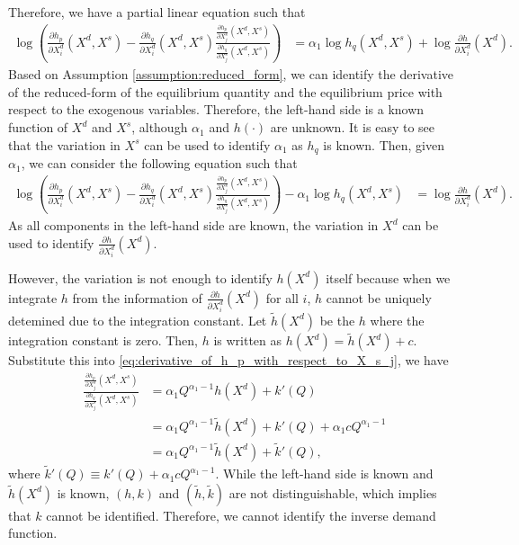\documentclass[11pt, a4paper]{article}
\theoremstyle{remark}
\begin{document}
Therefore, we have a partial linear equation such that
\begin{align}
    \log \left(\frac{\partial h_p}{\partial X^{d}_i}(X^{d}, X^{s})  - \frac{\partial h_q}{\partial X^{d}_i}(X^{d}, X^{s})\frac{\frac{\partial h_p}{\partial X^{s}_j}(X^{d}, X^{s})}{\frac{\partial h_q}{\partial X^{s}_j}(X^{d}, X^{s})}\right) & = \alpha_1 \log h_q(X^{d}, X^{s}) + \log \frac{\partial h}{\partial X^{d}_i}(X^{d}).
\end{align}
Based on Assumption \ref{assumption:reduced_form}, we can identify the derivative of the reduced-form of the equilibrium quantity and the equilibrium price with respect to the exogenous variables.
Therefore, the left-hand side is a known function of $X^{d}$ and $X^{s}$, although $\alpha_1$ and $h(\cdot)$ are unknown.
It is easy to see that the variation in $X^{s}$ can be used to identify $\alpha_1$ as $h_q$ is known.
Then, given $\alpha_1$, we can consider the following equation such that
\begin{align}
    \log \left(\frac{\partial h_p}{\partial X^{d}_i}(X^{d}, X^{s})  - \frac{\partial h_q}{\partial X^{d}_i}(X^{d}, X^{s})\frac{\frac{\partial h_p}{\partial X^{s}_j}(X^{d}, X^{s})}{\frac{\partial h_q}{\partial X^{s}_j}(X^{d}, X^{s})}\right) - \alpha_1 \log h_q(X^{d}, X^{s}) & = \log \frac{\partial h}{\partial X^{d}_i}(X^{d}).
\end{align}
As all components in the left-hand side are known, the variation in $X^{d}$ can be used to identify $\frac{\partial h}{\partial X^{d}_i}(X^{d})$.

However, the variation is not enough to identify $h(X^{d})$ itself because when we integrate $h$ from the information of $\frac{\partial h}{\partial X^{d}_i}(X^{d})$ for all $i$, $h$ cannot be uniquely detemined due to the integration constant.
Let $\tilde{h}(X^{d})$ be the $h$ where the integration constant is zero.
Then, $h$ is written as $h(X^{d}) = \tilde{h}(X^{d}) + c$.
Substitute this into \eqref{eq:derivative_of_h_p_with_respect_to_X_s_j}, we have
\begin{align}
    \frac{\frac{\partial h_p}{\partial X^{s}_j}(X^{d}, X^{s})}{\frac{\partial h_q}{\partial X^{s}_j}(X^{d}, X^{s})} &= \alpha_1 Q^{\alpha_1 - 1}h(X^{d}) + k'(Q)\\
    & = \alpha_1 Q^{\alpha_1 - 1}\tilde{h}(X^{d}) + k'(Q) + \alpha_1 c Q^{\alpha_1 - 1}\\
    & = \alpha_1 Q^{\alpha_1 - 1}\tilde{h}(X^{d}) + \tilde{k}'(Q),
\end{align}
where $\tilde{k}'(Q) \equiv k'(Q) + \alpha_1 c Q^{\alpha_1 - 1}$.
While the left-hand side is known and $\tilde{h}(X^{d})$ is known, $(h, k)$ and $(\tilde{h}, \tilde{k})$ are not distinguishable, which implies that $k$ cannot be identified.
Therefore, we cannot identify the inverse demand function.
\end{document}
